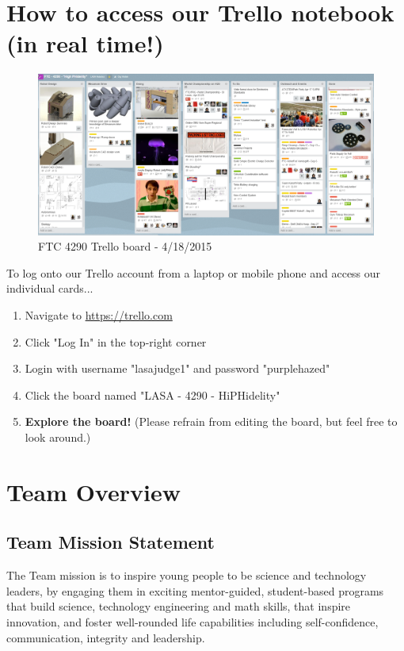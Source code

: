 \clearpage
\newpage

\section{How to access our Trello notebook (in real time!)}
\begin{figure}[H]
	\centering
	\includegraphics[width=\linewidth]{board}
	\caption[]{FTC 4290 Trello board - 4/18/2015}
	\label{fig:board}
\end{figure}

To log onto our Trello account from a laptop or mobile phone and access our individual cards...
\begin{enumerate}
\item Navigate to \url{https://trello.com}
\item Click "Log In" in the top-right corner
\item Login with username "lasajudge1" and password "purplehazed"
\item Click the board named "LASA - 4290 - HiPHidelity"
\item {\bf Explore the board!} (Please refrain from editing the board, but feel free to look around.)
\end{enumerate}

\clearpage
\newpage

\section{Team Overview}
\subsection{Team Mission Statement}
The Team mission is to inspire young people to be science and technology leaders, by engaging them in exciting mentor-guided, student-based programs that build science, technology engineering and math skills, that inspire innovation, and foster well-rounded life capabilities including self-confidence, communication, integrity and leadership.

